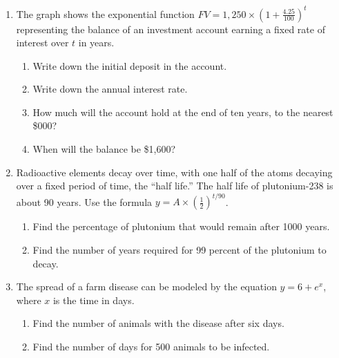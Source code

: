 \documentclass[12pt, twoside]{article}
\begin{document}
\begin{enumerate}
\newpage
\item The graph shows the exponential function $\displaystyle FV=1,250 \times \left( 1+\frac{4.25}{100} \right)^t$ representing the balance of an investment account earning a fixed rate of interest over $t$ in years.
\begin{multicols}{2}
    \begin{enumerate}[itemsep=1cm]
        \item Write down the initial deposit in the account.
        \item Write down the annual interest rate.
        \item How much will the account hold at the end of ten years, to the nearest \$000?
        \item When will the balance be \$1,600?
    \end{enumerate}
    \begin{center}
    \end{center}
    \end{multicols}

\item Radioactive elements decay over time, with one half of the atoms decaying over a fixed period of time, the ``half life.'' The half life of plutonium-238 is about 90 years. Use the formula $\displaystyle y=A \times \left( \frac{1}{2} \right)^{t/90}$. 
    \begin{enumerate}[itemsep=1.5cm]
        \item Find the percentage of plutonium that would remain after 1000 years.
        \item Find the number of years required for 99 percent of the plutonium to decay.
    \end{enumerate}

\item The spread of a farm disease can be modeled by the equation $\displaystyle y= 6 + e^x$, where $x$ is the time in days. 
    \begin{enumerate}[itemsep=1.5cm]
        \item Find the number of animals with the disease after six days.
        \item Find the number of days for 500 animals to be infected.
    \end{enumerate}
    

\end{enumerate}
\end{document}
